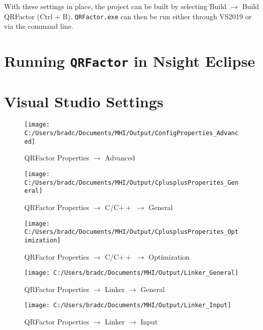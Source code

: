 \documentclass[11pt,letterpaper]{article}
\begin{document}
With these settings in place, the project can be built by selecting Build $\to$ Build QRFactor (Ctrl + B). \texttt{QRFactor.exe} can then be run either through VS2019 or via the command line.

\section{Running \texttt{QRFactor} in Nsight Eclipse}
\label{sec: nsight}


\appendix

\section{Visual Studio Settings}
\label{app: VS settings}

\begin{figure}[h]
  \centering
  \texttt{[image: C:/Users/bradc/Documents/MHI/Output/ConfigProperties\_Advanced]}
  \label{f: configproperties_advanced}
  \caption{QRFactor Properties $\to$ Advanced}
\end{figure}

\begin{figure}[h]
  \centering
  \texttt{[image: C:/Users/bradc/Documents/MHI/Output/CplusplusProperites\_General]}
  \caption{QRFactor Properties $\to$ C/C$++$ $\to$ General}
\end{figure}

\begin{figure}[h]
  \centering
  \texttt{[image: C:/Users/bradc/Documents/MHI/Output/CplusplusProperites\_Optimization]}
  \caption{QRFactor Properties $\to$ C/C$++$ $\to$ Optimization}
\end{figure}

\begin{figure}[h]
  \centering
  \texttt{[image: C:/Users/bradc/Documents/MHI/Output/Linker\_General]}
  \caption{QRFactor Properties $\to$ Linker $\to$ General}
\end{figure}

\begin{figure}[h]
  \centering
  \texttt{[image: C:/Users/bradc/Documents/MHI/Output/Linker\_Input]}
  \caption{QRFactor Properties $\to$ Linker $\to$ Input}
\end{figure}
\end{document}

